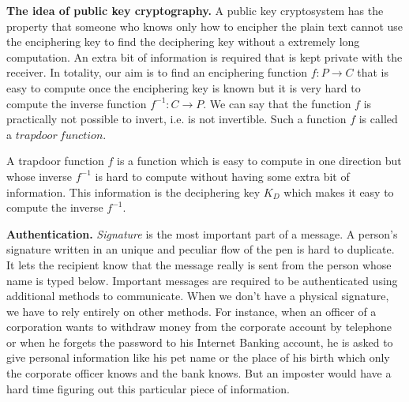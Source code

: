 \documentclass[12pt]{article}
\begin{document}
\textbf{The idea of public key cryptography.} A public key cryptosystem has the property that someone who knows only how to encipher the plain text cannot use the enciphering key to find the deciphering key without a extremely long computation. An extra bit of information is required that is kept private with the receiver. In totality, our aim is to find an enciphering function $f: P \longrightarrow C$ that is easy to compute once the enciphering key is known but it is very hard to compute  the inverse function $f^{-1}: C \longrightarrow P$. We can say that the function $f$ is practically not possible to invert, i.e. is not invertible. Such a function $f$ is called a $trapdoor \: function$.

A trapdoor function $f$ is a function which is easy to compute in one direction but whose inverse $f^{-1}$ is hard to compute without having some extra bit of information. This information is the deciphering key $K_D$ which makes it easy to compute the inverse $f^{-1}$.

\textbf{Authentication.} \textit{Signature} is the most important part of a message. A person's signature written in an unique and peculiar flow of the pen is hard to duplicate.  It lets the recipient know that the message really is sent from the person whose name is typed below. Important messages are required to be authenticated using additional methods to communicate. When we don't have a physical signature, we have to rely entirely on other methods. For instance, when an officer of a corporation wants to  withdraw money from the corporate account by telephone or when he forgets the password to his Internet Banking account, he is asked to give personal information like his pet name or the place of his birth which only the corporate officer knows and the bank knows. But an imposter would have a hard time figuring out this particular piece of information.
\end{document}
